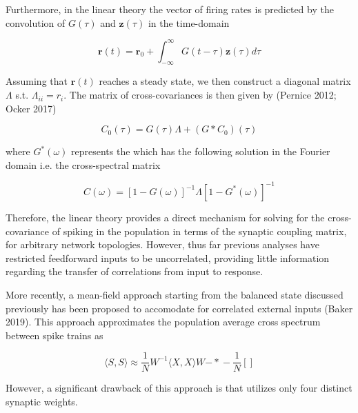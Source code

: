 \documentclass{ucetd}
\begin{document}
Furthermore, in the linear theory the vector of firing rates is predicted by the convolution of $G(\tau)$ and $\mathbf{z}(\tau)$ in the time-domain

\begin{equation}
\mathbf{r}(t) = \mathbf{r}_{0} + \int_{-\infty}^{\infty} G(t-\tau)\mathbf{z}(\tau)d\tau
\end{equation}

Assuming that $\mathbf{r}(t)$ reaches a steady state, we then construct a diagonal matrix $\Lambda$ s.t. $\Lambda_{ii} = r_{i}$. The matrix of cross-covariances is then given by (Pernice 2012; Ocker 2017)

\begin{equation}
C_{0}(\tau) = G(\tau)\Lambda + (G*C_{0})(\tau)
\end{equation} 

where $G^{*}(\omega)$ represents the which has the following solution in the Fourier domain i.e. the cross-spectral matrix 

\begin{equation}
C(\omega) = [1-G(\omega)]^{-1}\Lambda[1-G^{*}(\omega)]^{-1}
\end{equation} 

Therefore, the linear theory provides a direct mechanism for solving for the cross-covariance of spiking in the population in terms of the synaptic coupling matrix, for arbitrary network topologies. However, thus far previous analyses have restricted feedforward inputs to be uncorrelated, providing little information regarding the transfer of correlations from input to response. 

More recently, a mean-field approach starting from the balanced state discussed previously has been proposed to accomodate for correlated external inputs (Baker 2019). This approach approximates the population average cross spectrum between spike trains  as

\begin{equation}
\langle S,S\rangle \approx \frac{1}{N}W^{-1}\langle X,X\rangle W{-*} - \frac{1}{N}[]
\end{equation} 

However, a significant drawback of this approach is that utilizes only four distinct synaptic weights.
\end{document}
